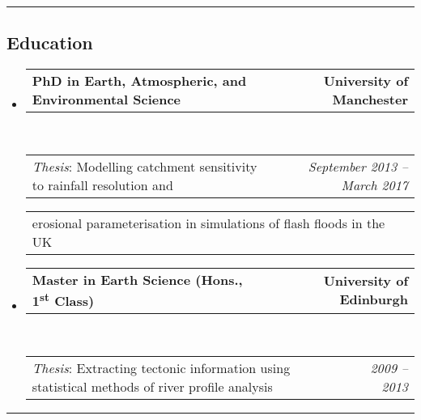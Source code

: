 \documentclass[10.5pt,a4]{article}
\makeatletter
\newcommand{\headerrow}[2]
{\begin{tabular*}{\linewidth}{l@{\extracolsep{\fill}}r}
	#1 &
	#2 \\
\end{tabular*}}
\makeatother
\begin{document}
\hrule
\vspace{-0.4em}
\subsection*{Education}
\begin{itemize}
	\parskip=0.1em
	
	\item 
	\headerrow
		{\textbf{PhD in Earth, Atmospheric, and Environmental Science}}
		{\textbf{University of Manchester}}
	\\
	\headerrow
		{\emph{Thesis}: Modelling catchment sensitivity to rainfall resolution and}
		{\emph{September 2013 -- March 2017}}
	\headerrow
		{\hspace{10mm} erosional parameterisation in simulations of flash floods in the UK}
		{}
  
	\item 
	\headerrow
		{\textbf{Master in Earth Science (Hons., 1\textsuperscript{st} Class)} }
		{\textbf{University of Edinburgh}}
	\\
	\headerrow
		{\emph{Thesis}: Extracting tectonic information using statistical methods of river profile analysis}
		{\emph{2009 -- 2013}}
\end{itemize}

\hrule
\vspace{-0.4em}
\end{document}
